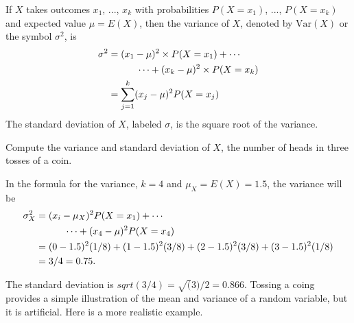 \begin{doublespace}
\begin{termBox}{
If $X$ takes outcomes $x_1$, ..., $x_k$ with probabilities $P(X=x_1)$, ..., $P(X=x_k)$ and expected value $\mu=E(X)$, then the variance of $X$, denoted by $\text{Var}(X)$ or the symbol $\sigma^2$, is
\begin{align}
\sigma^2 &= (x_1-\mu)^2\times P(X=x_1) + \cdots \notag \\
	& \qquad\quad\cdots+ (x_k-\mu)^2\times P(X=x_k) \notag \\
	&= \sum_{j=1}^{k} (x_j - \mu)^2 P(X=x_j)
\end{align}
The standard deviation of $X$, labeled $\sigma$, is the square root of the variance.}
\end{termBox}



\begin{example}{Compute the variance and standard deviation of $X$, the number of heads in three tosses of a coin.}
    
    In the formula for the variance, $k = 4$ and $\mu_X = E(X) = 1.5$, the variance will be 
    \begin{align}
    \sigma_X^2 &= (x_i-\mu_X)^2P(X=x_1) + \cdots \notag \\
    	& \qquad\quad\cdots+ (x_4-\mu)^2 P(X=x_4) \notag \\
    	&= (0- 1.5)^2(1/8) + (1 - 1.5)^2 (3/8) + 
        (2 -1.5)^2 (3/8) + (3-1.5)^2 (1/8) \notag \\
        &= 3/4 = 0.75.
    \end{align}
    
The standard deviation is $sqrt(3/4) = \sqrt(3)/2 = 0.866$.  Tossing a coing provides a simple illustration of the mean and variance of a random variable, but it is  artificial.  Here is a more realistic example.

\end{example}


\end{doublespace}
